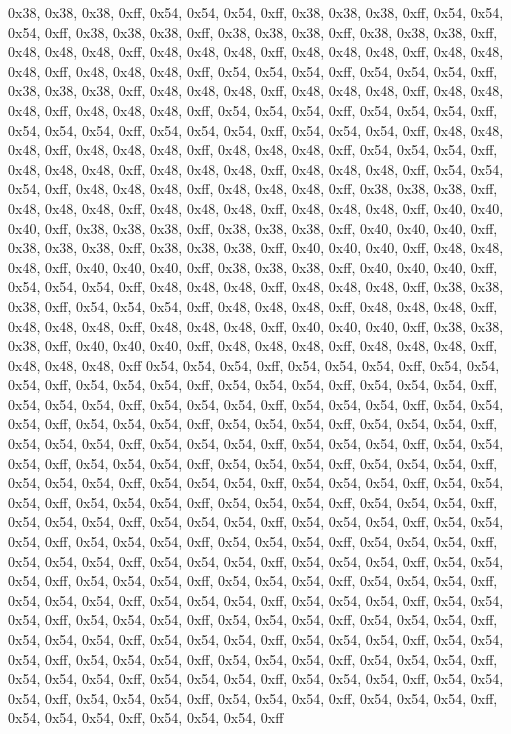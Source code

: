 0x38, 0x38, 0x38, 0xff, 0x54, 0x54, 0x54, 0xff, 0x38, 0x38, 0x38, 0xff, 0x54, 0x54, 0x54, 0xff, 0x38, 0x38, 0x38, 0xff, 0x38, 0x38, 0x38, 0xff, 0x38, 0x38, 0x38, 0xff, 0x48, 0x48, 0x48, 0xff, 0x48, 0x48, 0x48, 0xff, 0x48, 0x48, 0x48, 0xff, 0x48, 0x48, 0x48, 0xff, 0x48, 0x48, 0x48, 0xff, 0x54, 0x54, 0x54, 0xff, 0x54, 0x54, 0x54, 0xff, 0x38, 0x38, 0x38, 0xff, 0x48, 0x48, 0x48, 0xff, 0x48, 0x48, 0x48, 0xff, 0x48, 0x48, 0x48, 0xff, 0x48, 0x48, 0x48, 0xff, 0x54, 0x54, 0x54, 0xff, 0x54, 0x54, 0x54, 0xff, 0x54, 0x54, 0x54, 0xff, 0x54, 0x54, 0x54, 0xff, 0x54, 0x54, 0x54, 0xff, 0x48, 0x48, 0x48, 0xff, 0x48, 0x48, 0x48, 0xff, 0x48, 0x48, 0x48, 0xff, 0x54, 0x54, 0x54, 0xff, 0x48, 0x48, 0x48, 0xff, 0x48, 0x48, 0x48, 0xff, 0x48, 0x48, 0x48, 0xff, 0x54, 0x54, 0x54, 0xff, 0x48, 0x48, 0x48, 0xff, 0x48, 0x48, 0x48, 0xff, 0x38, 0x38, 0x38, 0xff, 0x48, 0x48, 0x48, 0xff, 0x48, 0x48, 0x48, 0xff, 0x48, 0x48, 0x48, 0xff, 0x40, 0x40, 0x40, 0xff, 0x38, 0x38, 0x38, 0xff, 0x38, 0x38, 0x38, 0xff, 0x40, 0x40, 0x40, 0xff, 0x38, 0x38, 0x38, 0xff, 0x38, 0x38, 0x38, 0xff, 0x40, 0x40, 0x40, 0xff, 0x48, 0x48, 0x48, 0xff, 0x40, 0x40, 0x40, 0xff, 0x38, 0x38, 0x38, 0xff, 0x40, 0x40, 0x40, 0xff, 0x54, 0x54, 0x54, 0xff, 0x48, 0x48, 0x48, 0xff, 0x48, 0x48, 0x48, 0xff, 0x38, 0x38, 0x38, 0xff, 0x54, 0x54, 0x54, 0xff, 0x48, 0x48, 0x48, 0xff, 0x48, 0x48, 0x48, 0xff, 0x48, 0x48, 0x48, 0xff, 0x48, 0x48, 0x48, 0xff, 0x40, 0x40, 0x40, 0xff, 0x38, 0x38, 0x38, 0xff, 0x40, 0x40, 0x40, 0xff, 0x48, 0x48, 0x48, 0xff, 0x48, 0x48, 0x48, 0xff, 0x48, 0x48, 0x48, 0xff
0x54, 0x54, 0x54, 0xff, 0x54, 0x54, 0x54, 0xff, 0x54, 0x54, 0x54, 0xff, 0x54, 0x54, 0x54, 0xff, 0x54, 0x54, 0x54, 0xff, 0x54, 0x54, 0x54, 0xff, 0x54, 0x54, 0x54, 0xff, 0x54, 0x54, 0x54, 0xff, 0x54, 0x54, 0x54, 0xff, 0x54, 0x54, 0x54, 0xff, 0x54, 0x54, 0x54, 0xff, 0x54, 0x54, 0x54, 0xff, 0x54, 0x54, 0x54, 0xff, 0x54, 0x54, 0x54, 0xff, 0x54, 0x54, 0x54, 0xff, 0x54, 0x54, 0x54, 0xff, 0x54, 0x54, 0x54, 0xff, 0x54, 0x54, 0x54, 0xff, 0x54, 0x54, 0x54, 0xff, 0x54, 0x54, 0x54, 0xff, 0x54, 0x54, 0x54, 0xff, 0x54, 0x54, 0x54, 0xff, 0x54, 0x54, 0x54, 0xff, 0x54, 0x54, 0x54, 0xff, 0x54, 0x54, 0x54, 0xff, 0x54, 0x54, 0x54, 0xff, 0x54, 0x54, 0x54, 0xff, 0x54, 0x54, 0x54, 0xff, 0x54, 0x54, 0x54, 0xff, 0x54, 0x54, 0x54, 0xff, 0x54, 0x54, 0x54, 0xff, 0x54, 0x54, 0x54, 0xff, 0x54, 0x54, 0x54, 0xff, 0x54, 0x54, 0x54, 0xff, 0x54, 0x54, 0x54, 0xff, 0x54, 0x54, 0x54, 0xff, 0x54, 0x54, 0x54, 0xff, 0x54, 0x54, 0x54, 0xff, 0x54, 0x54, 0x54, 0xff, 0x54, 0x54, 0x54, 0xff, 0x54, 0x54, 0x54, 0xff, 0x54, 0x54, 0x54, 0xff, 0x54, 0x54, 0x54, 0xff, 0x54, 0x54, 0x54, 0xff, 0x54, 0x54, 0x54, 0xff, 0x54, 0x54, 0x54, 0xff, 0x54, 0x54, 0x54, 0xff, 0x54, 0x54, 0x54, 0xff, 0x54, 0x54, 0x54, 0xff, 0x54, 0x54, 0x54, 0xff, 0x54, 0x54, 0x54, 0xff, 0x54, 0x54, 0x54, 0xff, 0x54, 0x54, 0x54, 0xff, 0x54, 0x54, 0x54, 0xff, 0x54, 0x54, 0x54, 0xff, 0x54, 0x54, 0x54, 0xff, 0x54, 0x54, 0x54, 0xff, 0x54, 0x54, 0x54, 0xff, 0x54, 0x54, 0x54, 0xff, 0x54, 0x54, 0x54, 0xff, 0x54, 0x54, 0x54, 0xff, 0x54, 0x54, 0x54, 0xff, 0x54, 0x54, 0x54, 0xff, 0x54, 0x54, 0x54, 0xff
